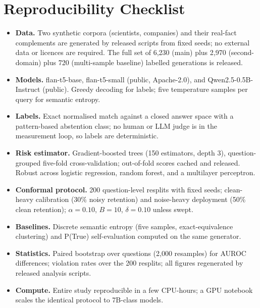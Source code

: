 \documentclass[11pt]{article}
\begin{document}
\section{Reproducibility Checklist}\label{app:repro}
\begin{itemize}
\item \textbf{Data.} Two synthetic corpora (scientists, companies) and
their real-fact complements are generated by released scripts from
fixed seeds; no external data or licences are required. The full set of
6{,}230 (main) plus 2{,}970 (second-domain) plus 720 (multi-sample
baseline) labelled generations is released.
\item \textbf{Models.} flan-t5-base, flan-t5-small (public,
Apache-2.0), and Qwen2.5-0.5B-Instruct (public). Greedy decoding for
labels; five temperature samples per query for semantic entropy.
\item \textbf{Labels.} Exact normalised match against a closed answer
space with a pattern-based abstention class; no human or LLM judge is
in the measurement loop, so labels are deterministic.
\item \textbf{Risk estimator.} Gradient-boosted trees (150 estimators,
depth 3), question-grouped five-fold cross-validation; out-of-fold
scores cached and released. Robust across logistic regression, random
forest, and a multilayer perceptron.
\item \textbf{Conformal protocol.} 200 question-level resplits with
fixed seeds; clean-heavy calibration (30\% noisy retention) and
noise-heavy deployment (50\% clean retention); $\alpha = 0.10$,
$B = 10$, $\delta = 0.10$ unless swept.
\item \textbf{Baselines.} Discrete semantic entropy (five samples,
exact-equivalence clustering) and P(True) self-evaluation computed on
the same generator.
\item \textbf{Statistics.} Paired bootstrap over questions (2{,}000
resamples) for AUROC differences; violation rates over the 200
resplits; all figures regenerated by released analysis scripts.
\item \textbf{Compute.} Entire study reproducible in a few CPU-hours; a
GPU notebook scales the identical protocol to 7B-class models.
\end{itemize}
\end{document}
